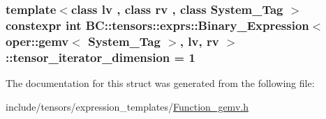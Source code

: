 \subsubsection[{\texorpdfstring{tensor\+\_\+iterator\+\_\+dimension}{tensor_iterator_dimension}}]{\setlength{\rightskip}{0pt plus 5cm}template$<$class lv , class rv , class System\+\_\+\+Tag $>$ constexpr int {\bf B\+C\+::tensors\+::exprs\+::\+Binary\+\_\+\+Expression}$<$ {\bf oper\+::gemv}$<$ System\+\_\+\+Tag $>$, lv, rv $>$\+::tensor\+\_\+iterator\+\_\+dimension = 1\hspace{0.3cm}{\ttfamily [static]}}\hypertarget{structBC_1_1tensors_1_1exprs_1_1Binary__Expression_3_01oper_1_1gemv_3_01System__Tag_01_4_00_01lv_00_01rv_01_4_a6cf1f09f15a9d2a8d612d689328b8dbc}{}\label{structBC_1_1tensors_1_1exprs_1_1Binary__Expression_3_01oper_1_1gemv_3_01System__Tag_01_4_00_01lv_00_01rv_01_4_a6cf1f09f15a9d2a8d612d689328b8dbc}


The documentation for this struct was generated from the following file\+:\begin{DoxyCompactItemize}
\item 
include/tensors/expression\+\_\+templates/\hyperlink{Function__gemv_8h}{Function\+\_\+gemv.\+h}\end{DoxyCompactItemize}
